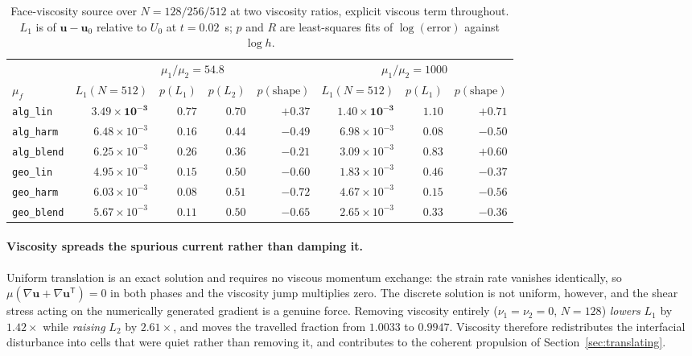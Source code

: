\documentclass[preprint,3p,11pt]{elsarticle}
\newcommand{\uvec}{\mathbf{u}}
\begin{document}
\begin{table}[t]
  \centering
  \caption{Face-viscosity source over $N=128/256/512$ at two viscosity ratios, explicit
  viscous term throughout. $L_1$ is of $\uvec-\uvec_0$ relative to $U_0$ at $t=0.02$~s;
  $p$ and $R$ are least-squares fits of $\log(\text{error})$ against $\log h$.}
  \label{tab:muf}
  \begin{tabular}{l r r r r r r r}
    \hline
    & \multicolumn{4}{c}{$\mu_1/\mu_2=54.8$} & \multicolumn{3}{c}{$\mu_1/\mu_2=1000$} \\
    $\mu_f$ & $L_1(N{=}512)$ & $p(L_1)$ & $p(L_2)$ & $p(\text{shape})$ & $L_1(N{=}512)$ & $p(L_1)$ & $p(\text{shape})$ \\
    \hline
    \texttt{alg\_lin}   & $\mathbf{3.49\times10^{-3}}$ & $\mathbf{0.77}$ & $0.70$ & $\mathbf{+0.37}$ & $\mathbf{1.40\times10^{-3}}$ & $\mathbf{1.10}$ & $\mathbf{+0.71}$ \\
    \texttt{alg\_harm}  & $6.48\times10^{-3}$ & $0.16$ & $0.44$ & $-0.49$ & $6.98\times10^{-3}$ & $0.08$ & $-0.50$ \\
    \texttt{alg\_blend} & $6.25\times10^{-3}$ & $0.26$ & $0.36$ & $-0.21$ & $3.09\times10^{-3}$ & $0.83$ & $+0.60$ \\
    \texttt{geo\_lin}   & $4.95\times10^{-3}$ & $0.15$ & $0.50$ & $-0.60$ & $1.83\times10^{-3}$ & $0.46$ & $-0.37$ \\
    \texttt{geo\_harm}  & $6.03\times10^{-3}$ & $0.08$ & $0.51$ & $-0.72$ & $4.67\times10^{-3}$ & $0.15$ & $-0.56$ \\
    \texttt{geo\_blend} & $5.67\times10^{-3}$ & $0.11$ & $0.50$ & $-0.65$ & $2.65\times10^{-3}$ & $0.33$ & $-0.36$ \\
    \hline
  \end{tabular}
\end{table}

\paragraph{Viscosity spreads the spurious current rather than damping it.} Uniform
translation is an exact solution and requires no viscous momentum exchange: the strain rate
vanishes identically, so $\mu(\nabla\uvec+\nabla\uvec^{\mathsf T})=0$ in both phases and the
viscosity jump multiplies zero. The discrete solution is not uniform, however, and the shear
stress acting on the numerically generated gradient is a genuine force. Removing viscosity
entirely ($\nu_1=\nu_2=0$, $N=128$) \emph{lowers} $L_1$ by $1.42\times$ while \emph{raising}
$L_2$ by $2.61\times$, and moves the travelled fraction from $1.0033$ to $0.9947$. Viscosity
therefore redistributes the interfacial disturbance into cells that were quiet rather than
removing it, and contributes to the coherent propulsion of Section~\ref{sec:translating}.
\end{document}
